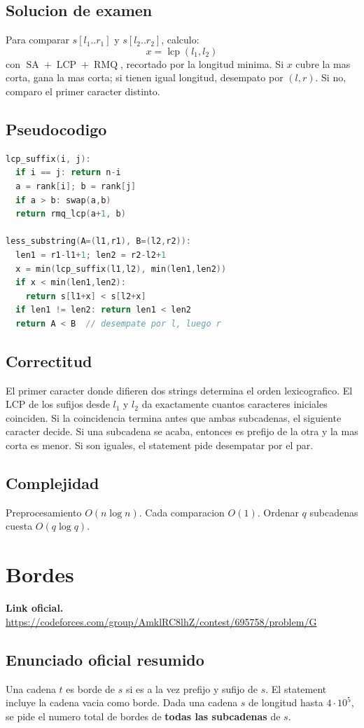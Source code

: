 \documentclass[10pt]{article}
\newcommand{\bigO}{O}
\newcommand{\SA}{\operatorname{SA}}
\newcommand{\LCP}{\operatorname{LCP}}
\newcommand{\RMQ}{\operatorname{RMQ}}
\newcommand{\lcp}{\operatorname{lcp}}
\begin{document}
\subsection{Solucion de examen}
Para comparar $s[l_1..r_1]$ y $s[l_2..r_2]$, calculo:
\[
x=\lcp(l_1,l_2)
\]
con $\SA+\LCP+\RMQ$, recortado por la longitud minima. Si $x$ cubre la mas
corta, gana la mas corta; si tienen igual longitud, desempato por $(l,r)$. Si
no, comparo el primer caracter distinto.

\subsection{Pseudocodigo}
\begin{lstlisting}[language=C++]
lcp_suffix(i, j):
  if i == j: return n-i
  a = rank[i]; b = rank[j]
  if a > b: swap(a,b)
  return rmq_lcp(a+1, b)

less_substring(A=(l1,r1), B=(l2,r2)):
  len1 = r1-l1+1; len2 = r2-l2+1
  x = min(lcp_suffix(l1,l2), min(len1,len2))
  if x < min(len1,len2):
    return s[l1+x] < s[l2+x]
  if len1 != len2: return len1 < len2
  return A < B  // desempate por l, luego r
\end{lstlisting}

\subsection{Correctitud}
El primer caracter donde difieren dos strings determina el orden lexicografico.
El LCP de los sufijos desde $l_1$ y $l_2$ da exactamente cuantos caracteres
iniciales coinciden. Si la coincidencia termina antes que ambas subcadenas, el
siguiente caracter decide. Si una subcadena se acaba, entonces es prefijo de la
otra y la mas corta es menor. Si son iguales, el statement pide desempatar por
el par.

\subsection{Complejidad}
Preprocesamiento $\bigO(n\log n)$. Cada comparacion $\bigO(1)$. Ordenar $q$
subcadenas cuesta $\bigO(q\log q)$.

\newpage

\section{Bordes}
\textbf{Link oficial.} \url{https://codeforces.com/group/AmklRC8lhZ/contest/695758/problem/G}

\subsection{Enunciado oficial resumido}
Una cadena $t$ es borde de $s$ si es a la vez prefijo y sufijo de $s$. El
statement incluye la cadena vacia como borde. Dada una cadena $s$ de longitud
hasta $4\cdot 10^5$, se pide el numero total de bordes de \textbf{todas las
subcadenas} de $s$.
\end{document}
